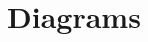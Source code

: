 \documentclass[a4paper,10pt]{article}
\begin{document}
	\newpage


	\newpage

	\section{Diagrams}

	

		
			
		



\end{document}
